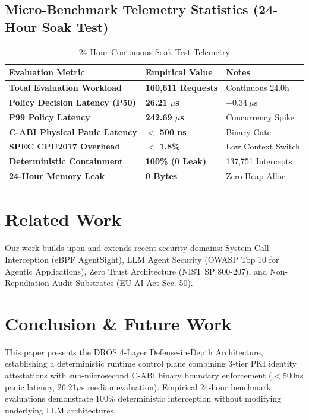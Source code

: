 \documentclass[conference]{IEEEtran}
\begin{document}
\subsection{Micro-Benchmark Telemetry Statistics (24-Hour Soak Test)}

\begin{table}[htbp]
\caption{24-Hour Continuous Soak Test Telemetry}
\begin{center}
\begin{tabular}{|p{3.5cm}|p{2.2cm}|p{2.0cm}|}
\hline
\textbf{Evaluation Metric} & \textbf{Empirical Value} & \textbf{Notes} \\ \hline
\textbf{Total Evaluation Workload} & \textbf{160,611 Requests} & Continuous 24.0h \\ \hline
\textbf{Policy Decision Latency (P50)} & \textbf{26.21 $\mu$s} & $\pm 0.34\ \mu\text{s}$ \\ \hline
\textbf{P99 Policy Latency} & \textbf{242.69 $\mu$s} & Concurrency Spike \\ \hline
\textbf{C-ABI Physical Panic Latency} & \textbf{$<$ 500 ns} & Binary Gate \\ \hline
\textbf{SPEC CPU2017 Overhead} & \textbf{$<$ 1.8\%} & Low Context Switch \\ \hline
\textbf{Deterministic Containment} & \textbf{100\% (0 Leak)} & 137,751 Intercepts \\ \hline
\textbf{24-Hour Memory Leak} & \textbf{0 Bytes} & Zero Heap Alloc \\ \hline
\end{tabular}
\end{center}
\end{table}

\section{Related Work}
Our work builds upon and extends recent security domains: System Call Interception (eBPF AgentSight), LLM Agent Security (OWASP Top 10 for Agentic Applications), Zero Trust Architecture (NIST SP 800-207), and Non-Repudiation Audit Substrates (EU AI Act Sec. 50).

\section{Conclusion \& Future Work}
This paper presents the DROS 4-Layer Defense-in-Depth Architecture, establishing a deterministic runtime control plane combining 3-tier PKI identity attestations with sub-microsecond C-ABI binary boundary enforcement ($<$500ns panic latency, 26.21$\mu$s median evaluation). Empirical 24-hour benchmark evaluations demonstrate 100\% deterministic interception without modifying underlying LLM architectures.
\end{document}
